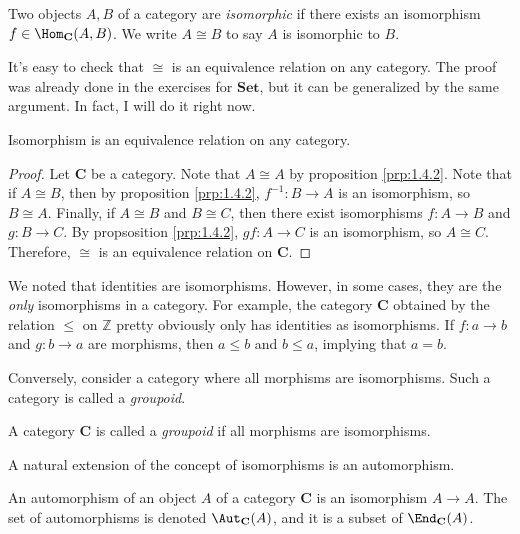 \begin{definition}[Isomorphic]\label{dfn:1.4.2}
	Two objects $A,B$ of a category are \emph{isomorphic} if there exists an isomorphism $f\in \Hom_{\mathbf{C}}(A , B) $. We write $A\cong B$ to say $A$ is isomorphic to $B$.
\end{definition}
It's easy to check that $\cong $ is an equivalence relation on any category. The proof was already done in the exercises for $\mathbf{Set}$, but it can be generalized by the same argument. In fact, I will do it right now.
\begin{proposition}\label{prp:1.4.3}
	Isomorphism is an equivalence relation on any category.
\end{proposition}
\begin{proof}
	Let $\mathbf{C}$ be a category. Note that $A\cong A$ by proposition \ref{prp:1.4.2}. Note that if $A\cong B$, then by proposition \ref{prp:1.4.2}, $f^{-1}: B \to A$ is an isomorphism, so $B\cong A$. Finally, if $A\cong B$ and $B\cong C$, then there exist isomorphisms $f : A \to B$ and $g : B \to C$. By propsosition \ref{prp:1.4.2}, $gf : A \to C$ is an isomorphism, so $A\cong C$. Therefore, $\cong $ is an equivalence relation on $\mathbf{C}$.
\end{proof}
We noted that identities are isomorphisms. However, in some cases, they are the \emph{only} isomorphisms in a category. For example, the category $\mathbf{C}$ obtained by the relation $\leq $ on $\mathbb{Z}$ pretty obviously only has identities as isomorphisms. If $f : a \to b$ and $g : b \to a$ are morphisms, then $a\leq b$ and $b\leq a$, implying that $a=b$.

Conversely, consider a category where all morphisms are isomorphisms. Such a category is called a \emph{groupoid}.
\begin{definition}[Groupoid]\label{dfn:1.4.3}
	A category $\mathbf{C}$ is called a \emph{groupoid} if all morphisms are isomorphisms.
\end{definition}
A natural extension of the concept of isomorphisms is an automorphism.
\begin{definition}[Automorphism]\label{dfn:1.4.4}
	An automorphism of an object $A$ of a category  $\mathbf{C}$ is an isomorphism $A\to A$. The set of automorphisms is denoted $\Aut_{\mathbf{C}}(A)$, and it is a subset of $\End_{\mathbf{C}}(A) $.
\end{definition}

